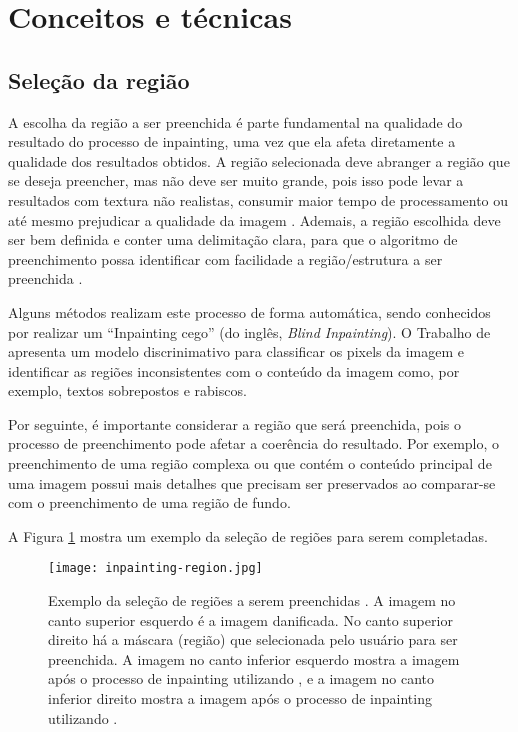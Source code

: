 




\section{Conceitos e técnicas} \label{concepts}

\subsection{Seleção da região} 
A escolha da região a ser preenchida é parte fundamental na qualidade do resultado do processo de inpainting, uma vez que ela afeta diretamente a qualidade dos resultados obtidos. A região selecionada deve abranger a região que se deseja preencher, mas não deve ser muito grande, pois isso pode levar a resultados com textura não realistas, consumir maior tempo de processamento ou até mesmo prejudicar a qualidade da imagem \cite{wang2020vcnet}.
Ademais, a região escolhida deve ser bem definida e conter uma delimitação clara, para que o algoritmo de preenchimento possa identificar com facilidade a região/estrutura a ser preenchida \cite{huang2014image}.

Alguns métodos realizam este processo de forma automática, sendo conhecidos por realizar um ``Inpainting cego'' (do inglês, \emph{Blind Inpainting}). O Trabalho de \cite{wang2020vcnet} apresenta um modelo discrinimativo para classificar os pixels da imagem e identificar as regiões inconsistentes com o conteúdo da imagem como, por exemplo, textos sobrepostos e rabiscos.

Por seguinte, é importante considerar a região que será preenchida, pois o processo de preenchimento pode afetar a coerência do resultado. Por exemplo, o preenchimento de uma região complexa ou que contém o conteúdo principal de uma imagem possui mais detalhes que precisam ser preservados ao comparar-se com o preenchimento de uma região de fundo.

A Figura \ref{fig:inpainting-region} mostra um exemplo da seleção de regiões para serem completadas.
\begin{figure}[ht]
\centering
\texttt{[image: inpainting-region.jpg]}
\caption{Exemplo da seleção de regiões a serem preenchidas \cite{OpenCVmessi}. A imagem no canto superior esquerdo é a imagem danificada. No canto superior direito há a máscara (região) que selecionada pelo usuário para ser preenchida. A imagem no canto inferior esquerdo mostra a imagem após o processo de inpainting utilizando \cite{Bertalmio2001navier}, e a imagem no canto inferior direito mostra a imagem após o processo de inpainting utilizando \cite{Telea2004}.}
\label{fig:inpainting-region}
\end{figure}

